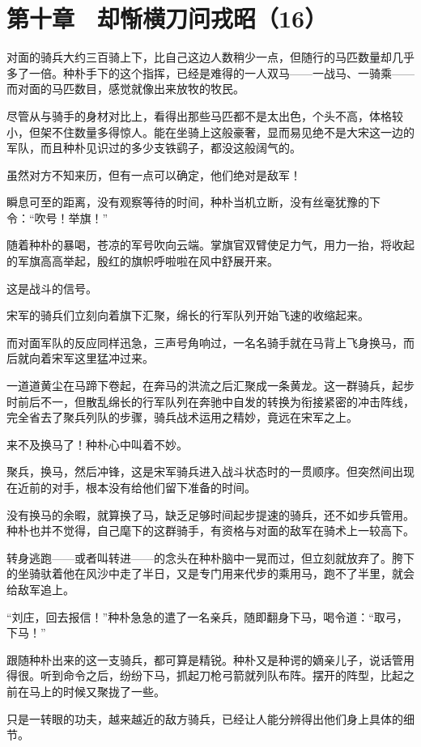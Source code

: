\section{第十章　却惭横刀问戎昭（16）}

对面的骑兵大约三百骑上下，比自己这边人数稍少一点，但随行的马匹数量却几乎多了一倍。种朴手下的这个指挥，已经是难得的一人双马——一战马、一骑乘——而对面的马匹数目，感觉就像出来放牧的牧民。

尽管从与骑手的身材对比上，看得出那些马匹都不是太出色，个头不高，体格较小，但架不住数量多得惊人。能在坐骑上这般豪奢，显而易见绝不是大宋这一边的军队，而且种朴见识过的多少支铁鹞子，都没这般阔气的。

虽然对方不知来历，但有一点可以确定，他们绝对是敌军！

瞬息可至的距离，没有观察等待的时间，种朴当机立断，没有丝毫犹豫的下令：“吹号！举旗！”

随着种朴的暴喝，苍凉的军号吹向云端。掌旗官双臂使足力气，用力一抬，将收起的军旗高高举起，殷红的旗帜呼啦啦在风中舒展开来。

这是战斗的信号。

宋军的骑兵们立刻向着旗下汇聚，绵长的行军队列开始飞速的收缩起来。

而对面军队的反应同样迅急，三声号角响过，一名名骑手就在马背上飞身换马，而后就向着宋军这里猛冲过来。

一道道黄尘在马蹄下卷起，在奔马的洪流之后汇聚成一条黄龙。这一群骑兵，起步时前后不一，但散乱绵长的行军队列在奔驰中自发的转换为衔接紧密的冲击阵线，完全省去了聚兵列队的步骤，骑兵战术运用之精妙，竟远在宋军之上。

来不及换马了！种朴心中叫着不妙。

聚兵，换马，然后冲锋，这是宋军骑兵进入战斗状态时的一贯顺序。但突然间出现在近前的对手，根本没有给他们留下准备的时间。

没有换马的余暇，就算换了马，缺乏足够时间起步提速的骑兵，还不如步兵管用。种朴也并不觉得，自己麾下的这群骑手，有资格与对面的敌军在骑术上一较高下。

转身逃跑——或者叫转进——的念头在种朴脑中一晃而过，但立刻就放弃了。胯下的坐骑驮着他在风沙中走了半日，又是专门用来代步的乘用马，跑不了半里，就会给敌军追上。

“刘庄，回去报信！”种朴急急的遣了一名亲兵，随即翻身下马，喝令道：“取弓，下马！”

跟随种朴出来的这一支骑兵，都可算是精锐。种朴又是种谔的嫡亲儿子，说话管用得很。听到命令之后，纷纷下马，抓起刀枪弓箭就列队布阵。摆开的阵型，比起之前在马上的时候又聚拢了一些。

只是一转眼的功夫，越来越近的敌方骑兵，已经让人能分辨得出他们身上具体的细节。

